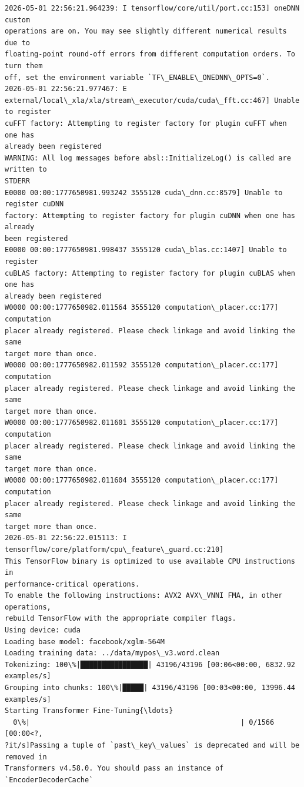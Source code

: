 \documentclass[11pt]{article}
\begin{document}
    \begin{Verbatim}[commandchars=\\\{\}]
2026-05-01 22:56:21.964239: I tensorflow/core/util/port.cc:153] oneDNN custom
operations are on. You may see slightly different numerical results due to
floating-point round-off errors from different computation orders. To turn them
off, set the environment variable `TF\_ENABLE\_ONEDNN\_OPTS=0`.
2026-05-01 22:56:21.977467: E
external/local\_xla/xla/stream\_executor/cuda/cuda\_fft.cc:467] Unable to register
cuFFT factory: Attempting to register factory for plugin cuFFT when one has
already been registered
WARNING: All log messages before absl::InitializeLog() is called are written to
STDERR
E0000 00:00:1777650981.993242 3555120 cuda\_dnn.cc:8579] Unable to register cuDNN
factory: Attempting to register factory for plugin cuDNN when one has already
been registered
E0000 00:00:1777650981.998437 3555120 cuda\_blas.cc:1407] Unable to register
cuBLAS factory: Attempting to register factory for plugin cuBLAS when one has
already been registered
W0000 00:00:1777650982.011564 3555120 computation\_placer.cc:177] computation
placer already registered. Please check linkage and avoid linking the same
target more than once.
W0000 00:00:1777650982.011592 3555120 computation\_placer.cc:177] computation
placer already registered. Please check linkage and avoid linking the same
target more than once.
W0000 00:00:1777650982.011601 3555120 computation\_placer.cc:177] computation
placer already registered. Please check linkage and avoid linking the same
target more than once.
W0000 00:00:1777650982.011604 3555120 computation\_placer.cc:177] computation
placer already registered. Please check linkage and avoid linking the same
target more than once.
2026-05-01 22:56:22.015113: I tensorflow/core/platform/cpu\_feature\_guard.cc:210]
This TensorFlow binary is optimized to use available CPU instructions in
performance-critical operations.
To enable the following instructions: AVX2 AVX\_VNNI FMA, in other operations,
rebuild TensorFlow with the appropriate compiler flags.
Using device: cuda
Loading base model: facebook/xglm-564M
Loading training data: ../data/mypos\_v3.word.clean
Tokenizing: 100\%|████████████████| 43196/43196 [00:06<00:00, 6832.92 examples/s]
Grouping into chunks: 100\%|█████| 43196/43196 [00:03<00:00, 13996.44 examples/s]
Starting Transformer Fine-Tuning{\ldots}
  0\%|                                                  | 0/1566 [00:00<?,
?it/s]Passing a tuple of `past\_key\_values` is deprecated and will be removed in
Transformers v4.58.0. You should pass an instance of `EncoderDecoderCache`

\end{Verbatim}
\end{document}
